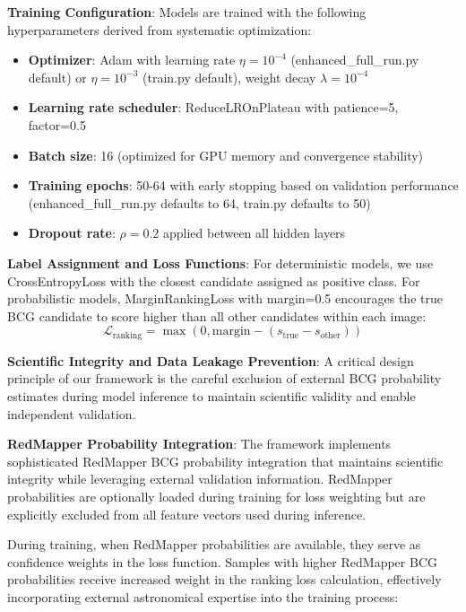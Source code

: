 \documentclass[twocolumn,10pt]{aastex631}
\begin{document}
\textbf{Training Configuration}: Models are trained with the following hyperparameters derived from systematic optimization:
\begin{itemize}
\item \textbf{Optimizer}: Adam with learning rate $\eta = 10^{-4}$ (enhanced\_full\_run.py default) or $\eta = 10^{-3}$ (train.py default), weight decay $\lambda = 10^{-4}$
\item \textbf{Learning rate scheduler}: ReduceLROnPlateau with patience=5, factor=0.5
\item \textbf{Batch size}: 16 (optimized for GPU memory and convergence stability)
\item \textbf{Training epochs}: 50-64 with early stopping based on validation performance (enhanced\_full\_run.py defaults to 64, train.py defaults to 50)
\item \textbf{Dropout rate}: $\rho = 0.2$ applied between all hidden layers
\end{itemize}

\textbf{Label Assignment and Loss Functions}: For deterministic models, we use CrossEntropyLoss with the closest candidate assigned as positive class. For probabilistic models, MarginRankingLoss with margin=0.5 encourages the true BCG candidate to score higher than all other candidates within each image:
\begin{equation}
\mathcal{L}_{\text{ranking}} = \max(0, \text{margin} - (s_{\text{true}} - s_{\text{other}}))
\end{equation}

\textbf{Scientific Integrity and Data Leakage Prevention}: A critical design principle of our framework is the careful exclusion of external BCG probability estimates during model inference to maintain scientific validity and enable independent validation.

\textbf{RedMapper Probability Integration}: The framework implements sophisticated RedMapper BCG probability integration \citep{Rykoff2014redMaPPer} that maintains scientific integrity while leveraging external validation information. RedMapper probabilities are optionally loaded during training for loss weighting but are explicitly excluded from all feature vectors used during inference.

During training, when RedMapper probabilities are available, they serve as confidence weights in the loss function. Samples with higher RedMapper BCG probabilities receive increased weight in the ranking loss calculation, effectively incorporating external astronomical expertise into the training process:
\end{document}
